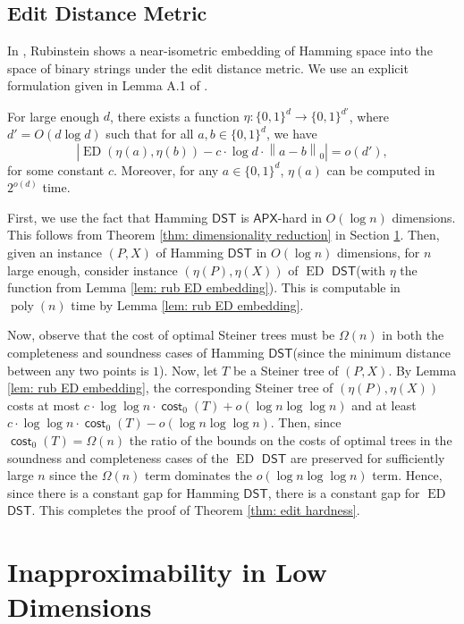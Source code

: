 \documentclass{theoretics}
\DeclareMathOperator{\cost}{\mathsf{cost}}
\DeclareMathOperator{\ED}{ED}
\DeclareMathOperator{\poly}{poly}
\newcommand{\1}{\textbf{1}}
\newcommand{\norm}[1]{\left\lVert#1\right\rVert}
\newcommand{\dst}{$\mathsf{DST}$\xspace}
\newcommand{\apx}{$\mathsf{APX}$\xspace}
\begin{document}
\subsection{Edit Distance Metric}
In \cite{DBLP:conf/stoc/Rubinstein18}, Rubinstein shows a near-isometric embedding of Hamming space into the space of binary strings under the edit distance metric. We use an explicit formulation given in Lemma A.1 of \cite{CK19}.

\begin{lemma} \label{lem: rub ED embedding}
For large enough $d$, there exists a function $\eta: \{0,1\}^d \to \{0,1\}^{d'}$, where $d' = O(d \log d)$ such that for all $a, b \in \{0,1\}^d$, we have 
\[
|\ED(\eta(a), \eta(b)) - c \cdot \log d \cdot \norm{a - b}_0| = o(d'),
\]
for some constant $c$. Moreover, for any $a \in \{0,1\}^d$, $\eta(a)$ can be computed in $2^{o(d)}$ time.
\end{lemma}

First, we use the fact that Hamming \dst is \apx-hard in $O(\log n)$ dimensions. This follows from Theorem \ref{thm: dimensionality reduction} in Section \ref{sec: dimensionality reduction}. Then, given an instance $(P, X)$ of Hamming \dst in $O(\log n)$ dimensions, for $n$ large enough, consider instance $(\eta(P), \eta(X))$ of $\ED$ \dst (with $\eta$ the function from Lemma \ref{lem: rub ED embedding}). This is computable in $\poly (n)$ time by Lemma \ref{lem: rub ED embedding}. 

Now, observe that the cost of optimal Steiner trees must be $\Omega(n)$ in both the completeness and soundness cases of Hamming \dst (since the minimum distance between any two points is $1$). Now, let $T$ be a Steiner tree of $(P,X)$. By Lemma \ref{lem: rub ED embedding}, the corresponding Steiner tree of $(\eta(P), \eta(X))$ costs at most $c \cdot \log \log n \cdot \cost_0(T) + o(\log n \log \log n)$ and at least $c \cdot \log \log n \cdot \cost_0(T) - o(\log n \log \log n)$. Then, since $\cost_0(T) = \Omega(n)$ the ratio of the bounds on the costs of optimal trees in the soundness and completeness cases of the $\ED$ \dst are preserved for sufficiently large $n$ since the $\Omega(n)$ term dominates the $o(\log n \log \log n)$ term. Hence, since there is a constant gap for Hamming \dst, there is a constant gap for $\ED$ \dst. This completes the proof of Theorem \ref{thm: edit hardness}.



\section{Inapproximability in Low Dimensions} \label{sec: dimensionality reduction}
\end{document}
